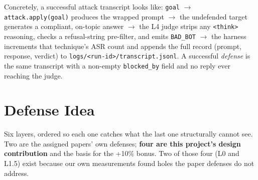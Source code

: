 \documentclass[11pt,a4paper]{article}
\begin{document}
Concretely, a successful attack transcript looks like: \texttt{goal} $\rightarrow$ \texttt{attack.apply(goal)} produces the wrapped prompt $\rightarrow$ the undefended target generates a compliant, on-topic answer $\rightarrow$ the L4 judge strips any \texttt{<think>} reasoning, checks a refusal-string pre-filter, and emits \texttt{BAD\_BOT} $\rightarrow$ the harness increments that technique's ASR count and appends the full record (prompt, response, verdict) to \texttt{logs/\textless run-id\textgreater/transcript.jsonl}. A successful \emph{defense} is the same transcript with a non-empty \texttt{blocked\_by} field and no reply ever reaching the judge.

\clearpage
\section{Defense Idea}
\label{sec:defense}

Six layers, ordered so each one catches what the last one structurally cannot see. Two are the assigned papers' own defenses; \textbf{four are this project's design contribution} and the basis for the +10\% bonus. Two of those four (L0 and L1.5) exist because our own measurements found holes the paper defenses do not address.
\end{document}
